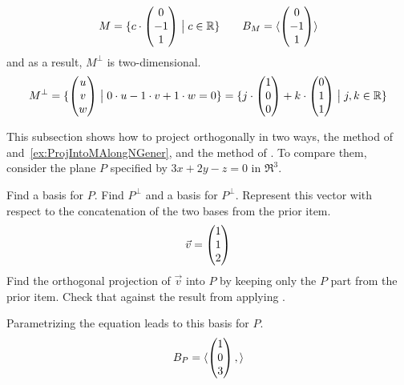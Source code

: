 \begin{exercises}
\begin{answer}
\begin{exparts}
\begin{equation*}
              M=\mbox{$\{c\cdot\begin{pmatrix} 0 \\ -1 \\ 1 \end{pmatrix}\bigm| c\in\mathbb{R}\}$}
              \qquad
              B_M=\langle\begin{pmatrix} 0 \\ -1 \\ 1 \end{pmatrix}\rangle
            \end{equation*}
            and as a result, $M^\perp$ is two-dimensional.
            \begin{equation*}
              M^\perp
              =\mbox{$\{\begin{pmatrix} u \\ v \\ w \end{pmatrix}
                     \bigm| 0\cdot u-1\cdot v+1\cdot w=0\}$}
              =\mbox{$\{j\cdot\begin{pmatrix} 1 \\ 0 \\ 0 \end{pmatrix}
                    +k\cdot\begin{pmatrix} 0 \\ 1 \\ 1 \end{pmatrix}\bigm| j,k\in\mathbb{R}\}$}
            \end{equation*}
       \end{exparts}
     \end{answer}
  \item 
    This subsection shows how to project orthogonally in two ways,
    the method of  
    and~\ref{ex:ProjIntoMAlongNGener}, and the method of 
    .
    To compare them, 
    consider the plane $P$ specified by $3x+2y-z=0$ in $\Re^3$.
    \begin{exparts}
      \partsitem Find a basis for $P$.
      \partsitem Find $P^\perp$ and a basis for $P^\perp$. 
      \partsitem Represent this vector with respect to the concatenation
        of the two bases from the prior item.
        \begin{equation*}
          \vec{v}=\begin{pmatrix} 1 \\ 1 \\ 2 \end{pmatrix}
        \end{equation*}
      \partsitem Find the orthogonal projection of $\vec{v}$ into $P$
        by keeping only the $P$ part from the prior item.
      \partsitem Check that against the result from applying
        .
    \end{exparts}
    \begin{answer}
      \begin{exparts}
        \partsitem Parametrizing the equation leads to this basis for
          $P$.
          \begin{equation*}
            B_P=\langle\begin{pmatrix} 1 \\ 0 \\ 3 \end{pmatrix},
\rangle
\end{equation*}
\end{exparts}
\end{answer}
\end{exercises}
